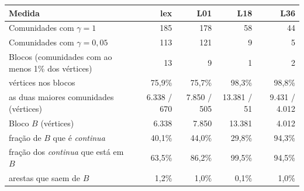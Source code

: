 \begin{tabular}{lrrrr}
\toprule
Medida & lex & L01 & L18 & L36 \\
\midrule
Comunidades com $\gamma = 1$ & 185 & 178 & 58 & 44 \\
Comunidades com $\gamma = 0{,}05$ & 113 & 121 & 9 & 5 \\
Blocos (comunidades com ao menos 1\% dos vértices) & 13 & 9 & 1 & 2 \\
\quad vértices nos blocos & 75,9\% & 75,7\% & 98,3\% & 98,8\% \\
\quad as duas maiores comunidades (vértices) & 6.338 / 670 & 7.850 / 505 & 13.381 / 51 & 9.431 / 4.012 \\
Bloco $B$ (vértices) & 6.338 & 7.850 & 13.381 & 4.012 \\
\quad fração de $B$ que é \emph{continua} & 40,1\% & 44,0\% & 29,8\% & 94,3\% \\
\quad fração dos \emph{continua} que está em $B$ & 63,5\% & 86,2\% & 99,5\% & 94,5\% \\
\quad arestas que saem de $B$ & 1,2\% & 1,0\% & 0,1\% & 1,0\% \\
\bottomrule
\end{tabular}

